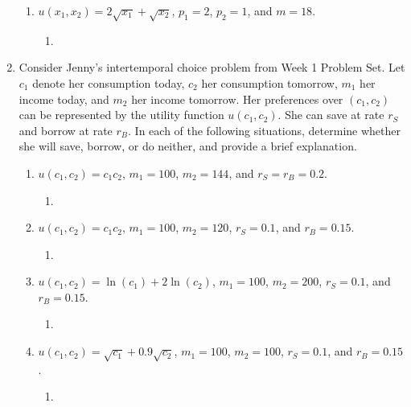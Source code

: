 \documentclass[11pt]{article}
\begin{document}
\begin{enumerate}
\begin{enumerate}
        \item $u(x_{1},x_{2})=2\sqrt{x_{1}}+\sqrt{x_{2}}$, $p_{1}=2$, $p_{2}=1$, and $m=18$.
        \begin{enumerate}
            \item 
        \end{enumerate}
    \end{enumerate}

\item Consider Jenny's intertemporal choice problem from Week 1 Problem Set. Let $c_{1}$ denote her consumption today, $c_{2}$ her consumption tomorrow, $m_{1}$ her income today, and $m_{2}$ her income tomorrow. Her preferences over $(c_{1},c_{2})$ can be represented by the utility function $u(c_{1},c_{2})$. She can save at rate $r_{S}$ and borrow at rate $r_{B}$. In each of the following situations, determine whether she will save, borrow, or do neither, and provide a brief explanation.

    \begin{enumerate}
        \item $u(c_{1},c_{2})=c_{1}c_{2}$, $m_{1}=100$, $m_{2}=144$, and $r_{S}=r_{B}=0.2$.
        \begin{enumerate}
            \item 
        \end{enumerate}

        \item $u(c_{1},c_{2})=c_{1}c_{2}$, $m_{1}=100$, $m_{2}=120$, $r_{S}=0.1$, and $r_{B}=0.15$.
        \begin{enumerate}
            \item 
        \end{enumerate}

        \item $u(c_{1},c_{2})=\ln(c_{1})+2\ln(c_{2})$, $m_{1}=100$, $m_{2}=200$, $r_{S}=0.1$, and $r_{B}=0.15$.
        \begin{enumerate}
            \item 
        \end{enumerate}

        \item $u(c_{1},c_{2})=\sqrt{c_{1}}+0.9\sqrt{c_{2}}$, $m_{1}=100$, $m_{2}=100$, $r_{S}=0.1$, and $r_{B}=0.15$.
        \begin{enumerate}
            \item 
        \end{enumerate}
    \end{enumerate}


\end{enumerate}
\end{document}
